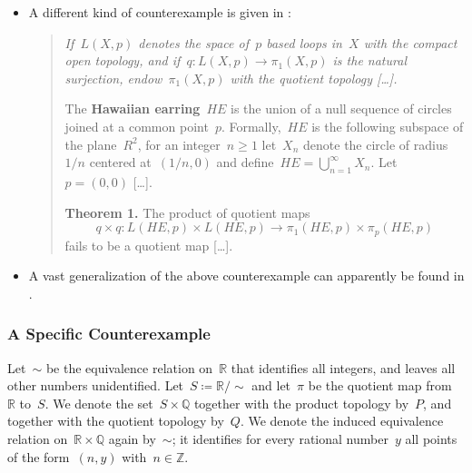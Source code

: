 \begin{itemize}
\begin{quote}
\begin{enumerate}[label=(\alph*\upshape)]
			\end{enumerate}
		\end{quote}
		The~ mentioned here is defined as follows:
		the set~$K$ is defined as~$\{ 1/n \suchthat n ∈ ℤ_+ \}$, and the~ on~$ℝ$ is generated by all open intervals~$(a, b)$ together with all sets of the form~$(a, b) ∖ K$.
		(The~ is thus finer than the standard topology.)


	\item
		A different kind of counterexample is given in \cite{fabel_hawaiian_earring_discontinuous}:
		\begin{quote}
			\itshape
			If~$L(X, p)$ denotes the space of~$p$ based loops in~$X$ with the compact open topology, and if~$q \colon L(X, p) \to π_1(X, p)$ is the natural surjection, endow~$π_1(X, p)$ with the quotient topology \textup[…\textup].

			The \textbf{Hawaiian earring}~$HE$ is the union of a null sequence of circles joined at a common point~$p$.
			Formally,~$HE$ is the following subspace of the plane~$R^2$, for an integer~$n ≥ 1$ let~$X_n$ denote the circle of radius~$1/n$ centered at~$(1/n, 0)$ and define~$HE = ⋃_{n = 1}^∞ X_n$.
			Let~$p = (0, 0)$ \textup[…\textup].

			\textbf{Theorem 1.}
			The product of quotient maps
			\[
				q × q \colon L(HE, p) × L(HE, p) \to π_1(HE, p) × π_p(HE, p)
			\]
			fails to be a quotient map \textup[…\textup].
		\end{quote}

	\item
		A vast generalization of the above counterexample can apparently be found in \cite{brazas_topological_fundamental_group}.
\end{itemize}



\subsubsection{A Specific Counterexample}

Let~$∼$ be the equivalence relation on~$ℝ$ that identifies all integers, and leaves all other numbers unidentified.
Let~$S ≔ ℝ / {∼}$ and let~$π$ be the quotient map from~$ℝ$ to~$S$.
We denote the set~$S × ℚ$ together with the product topology by~$P$, and together with the quotient topology by~$Q$.
We denote the induced equivalence relation on~$ℝ × ℚ$ again by~$∼$;
it identifies for every rational number~$y$ all points of the form~$(n, y)$ with~$n ∈ ℤ$.


